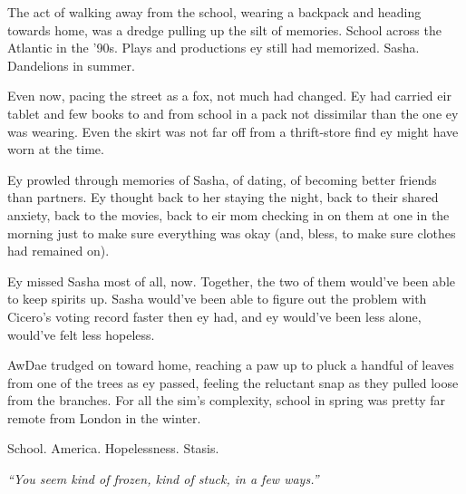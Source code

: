 The act of walking away from the school, wearing a backpack and heading towards home, was a dredge pulling up the silt of memories. School across the Atlantic in the '90s. Plays and productions ey still had memorized. Sasha. Dandelions in summer.

Even now, pacing the street as a fox, not much had changed. Ey had carried eir tablet and few books to and from school in a pack not dissimilar than the one ey was wearing. Even the skirt was not far off from a thrift-store find ey might have worn at the time.

Ey prowled through memories of Sasha, of dating, of becoming better friends than partners. Ey thought back to her staying the night, back to their shared anxiety, back to the movies, back to eir mom checking in on them at one in the morning just to make sure everything was okay (and, bless, to make sure clothes had remained on).

Ey missed Sasha most of all, now. Together, the two of them would've been able to keep spirits up. Sasha would've been able to figure out the problem with Cicero's voting record faster then ey had, and ey would've been less alone, would've felt less hopeless.

AwDae trudged on toward home, reaching a paw up to pluck a handful of leaves from one of the trees as ey passed, feeling the reluctant snap as they pulled loose from the branches. For all the sim's complexity, school in spring was pretty far remote from London in the winter.

School. America. Hopelessness. Stasis.

\emph{``You seem kind of frozen, kind of stuck, in a few ways.''}
